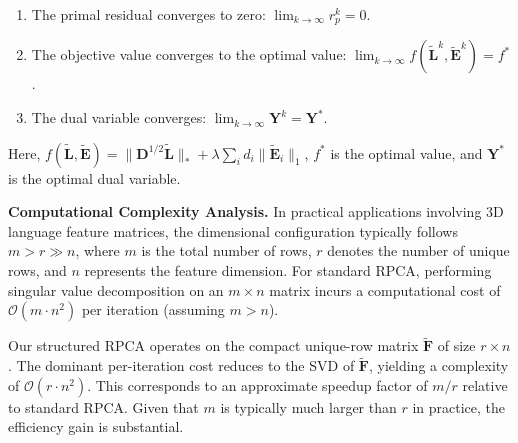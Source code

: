 \begin{enumerate}
\item The primal residual converges to zero: $\lim_{k \to \infty} r_p^k = 0$.
\item The objective value converges to the optimal value: $\lim_{k \to \infty} f(\tilde{\mathbf{L}}^k, \tilde{\mathbf{E}}^k) = f^*$.
\item The dual variable converges: $\lim_{k \to \infty} \mathbf{Y}^k = \mathbf{Y}^*$.
\end{enumerate}
Here, $f(\tilde{\mathbf{L}}, \tilde{\mathbf{E}}) = \|\mathbf{D}^{1/2} \tilde{\mathbf{L}}\|_* + \lambda \sum_i d_i \|\tilde{\mathbf{E}}_i\|_1$, $f^*$ is the optimal value, and $\mathbf{Y}^*$ is the optimal dual variable.

\noindent\textbf{Computational Complexity Analysis.}
In practical applications involving 3D language feature matrices, the dimensional configuration typically follows $m > r \gg n$, where $m$ is the total number of rows, $r$ denotes the number of unique rows, and $n$ represents the feature dimension. For standard RPCA, performing singular value decomposition on an $m \times n$ matrix incurs a computational cost of $\mathcal{O}(m \cdot n^2)$ per iteration (assuming $m > n$). 

Our structured RPCA operates on the compact unique-row matrix $\tilde{\mathbf{F}}$ of size $r \times n$. The dominant per-iteration cost reduces to the SVD of $\tilde{\mathbf{F}}$, yielding a complexity of $\mathcal{O}(r \cdot n^2)$. This corresponds to an approximate speedup factor of $m/r$ relative to standard RPCA. Given that $m$ is typically much larger than $r$ in practice, the efficiency gain is substantial.


